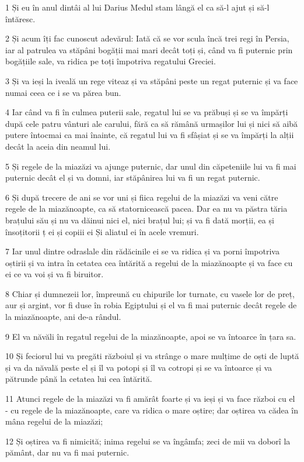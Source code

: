 \par 1 Și eu în anul dintâi al lui Darius Medul stam lângă el ca să-l ajut și să-l întăresc.
\par 2 Și acum îți fac cunoscut adevărul: Iată că se vor scula încă trei regi în Persia, iar al patrulea va stăpâni bogății mai mari decât toți și, când va fi puternic prin bogățiile sale, va ridica pe toți împotriva regatului Greciei.
\par 3 Și va ieși la iveală un rege viteaz și va stăpâni peste un regat puternic și va face numai ceea ce i se va părea bun.
\par 4 Iar când va fi în culmea puterii sale, regatul lui se va prăbuși și se va împărți după cele patru vânturi ale carului, fără ca să rămână urmașilor lui și nici să aibă putere întocmai ca mai înainte, că regatul lui va fi sfâșiat și se va împărți la alții decât la aceia din neamul lui.
\par 5 Și regele de la miazăzi va ajunge puternic, dar unul din căpeteniile lui va fi mai puternic decât el și va domni, iar stăpânirea lui va fi un regat puternic.
\par 6 Și după trecere de ani se vor uni și fiica regelui de la miazăzi va veni către regele de la miazănoapte, ca să statornicească pacea. Dar ea nu va păstra tăria brațului său și nu va dăinui nici el, nici brațul lui; și va fi dată morții, ea și însoțitorii ț ei și copiii ei Și aliatul ei în acele vremuri.
\par 7 Iar unul dintre odraslale din rădăcinile ei se va ridica și va porni împotriva oștirii și va intra în cetatea cea întărită a regelui de la miazănoapte și va face cu ei ce va voi și va fi biruitor.
\par 8 Chiar și dumnezeii lor, împreună cu chipurile lor turnate, cu vasele lor de preț, aur și argint, vor fi duse în robia Egiptului și el va fi mai puternic decât regele de la miazănoapte, ani de-a rândul.
\par 9 El va năvăli în regatul regelui de la miazănoapte, apoi se va întoarce în țara sa.
\par 10 Și feciorul lui va pregăti războiul și va strânge o mare mulțime de oști de luptă și va da năvală peste el și îl va potopi și îl va cotropi și se va întoarce și va pătrunde până la cetatea lui cea întărită.
\par 11 Atunci regele de la miazăzi va fi amărât foarte și va ieși și va face război cu el - cu regele de la miazănoapte, care va ridica o mare oștire; dar oștirea va cădea în mâna regelui de la miazăzi;
\par 12 Și oștirea va fi nimicită; inima regelui se va îngâmfa; zeci de mii va doborî la pământ, dar nu va fi mai puternic.
